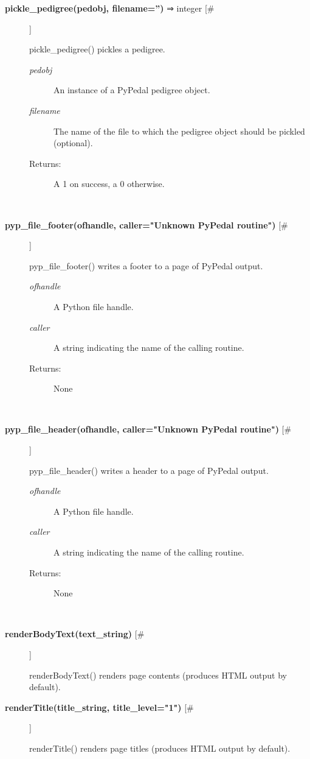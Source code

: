 \begin{description}
\item[\textbf{pickle\_pedigree(pedobj, filename='')} ⇒ integer [\#]
]
\par pickle\_pedigree() pickles a pedigree.
\begin{description}
\item[\textit{pedobj}
]
An instance of a PyPedal pedigree object.
\item[\textit{filename}
]
The name of the file to which the pedigree object should be pickled (optional).
\item[Returns:
]
A 1 on success, a 0 otherwise.
\end{description}\\

\item[\textbf{pyp\_file\_footer(ofhandle, caller="Unknown PyPedal routine")} [\#]
]
\par pyp\_file\_footer() writes a footer to a page of PyPedal output.
\begin{description}
\item[\textit{ofhandle}
]
A Python file handle.
\item[\textit{caller}
]
A string indicating the name of the calling routine.
\item[Returns:
]
None
\end{description}\\

\item[\textbf{pyp\_file\_header(ofhandle, caller="Unknown PyPedal routine")} [\#]
]
\par pyp\_file\_header() writes a header to a page of PyPedal output.
\begin{description}
\item[\textit{ofhandle}
]
A Python file handle.
\item[\textit{caller}
]
A string indicating the name of the calling routine.
\item[Returns:
]
None
\end{description}\\

\item[\textbf{renderBodyText(text\_string)} [\#]
]
\par renderBodyText() renders page contents (produces HTML output by default).

\item[\textbf{renderTitle(title\_string, title\_level="1")} [\#]
]
\par renderTitle() renders page titles (produces HTML output by default).


\end{description}
